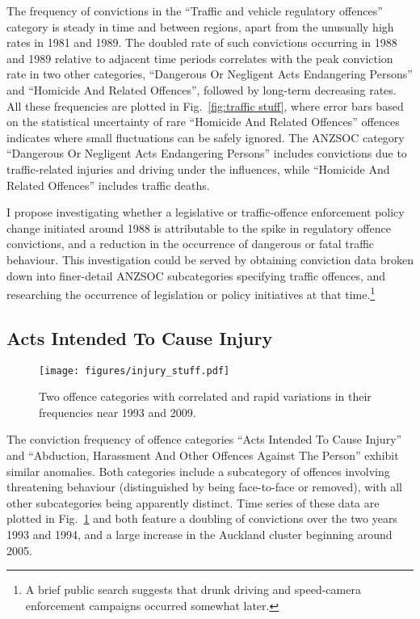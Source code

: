 \documentclass[onecolumn]{myarticle}
\begin{document}
The frequency of convictions in the ``Traffic and vehicle regulatory offences'' category is steady in time and between regions, apart from the unusually high rates in 1981 and 1989. 
The doubled rate of such convictions occurring in 1988 and 1989 relative to adjacent time periods correlates with the peak conviction rate in two other categories, ``Dangerous Or Negligent Acts Endangering Persons'' and ``Homicide And Related Offences'', followed by long-term decreasing rates.
All these frequencies are plotted in Fig.~\ref{fig:traffic stuff}, where error bars based on the statistical uncertainty of rare ``Homicide And Related Offences'' offences indicates where small fluctuations can be safely ignored.
The ANZSOC category ``Dangerous Or Negligent Acts Endangering Persons'' includes convictions due to traffic-related injuries and driving under the influences, while ``Homicide And Related Offences'' includes traffic deaths.  

I propose investigating whether a legislative or traffic-offence enforcement policy change initiated around 1988 is attributable to the spike in regulatory offence convictions, and a reduction in the occurrence of dangerous or fatal traffic behaviour.
This investigation could be served by obtaining conviction data broken down into finer-detail ANZSOC subcategories specifying traffic offences, and researching the occurrence of legislation or policy initiatives at that time.\footnote{A brief public search suggests that drunk driving and speed-camera enforcement campaigns occurred somewhat later.}

\subsection*{Acts Intended To Cause Injury}

\begin{figure}
  \centering
  \texttt{[image: figures/injury\_stuff.pdf]}
  \caption{Two offence categories with correlated and rapid variations in their frequencies near 1993 and 2009.}
  \label{fig:injury stuff}
\end{figure}

The conviction frequency of offence categories ``Acts Intended To Cause Injury'' and ``Abduction, Harassment And Other Offences Against The Person'' exhibit similar anomalies.
Both categories include a subcategory of offences involving threatening behaviour (distinguished by being face-to-face or removed), with all other subcategories being apparently distinct.
Time series of these data are plotted in Fig.~\ref{fig:injury stuff} and both feature a doubling of convictions over the two years 1993 and 1994, and a large increase in the Auckland cluster beginning around 2005.
\end{document}
